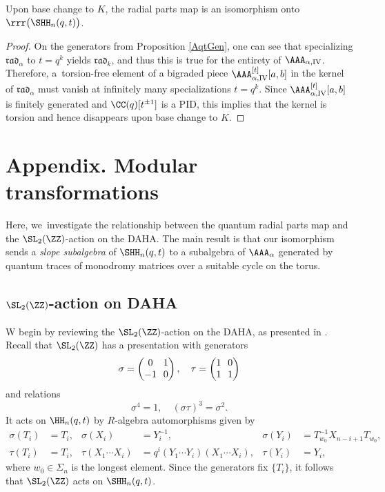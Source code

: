 \begin{thm}
Upon base change to $K$, the radial parts map is an isomorphism onto $\rrr\bigl(\SHH_n(q,t) \bigr)$.
\end{thm}

\begin{proof}
On the generators from Proposition \ref{AqtGen}, one can see that specializing $\mathfrak{rad}_\alpha$ to $t=q^k$ yields $\mathfrak{rad}_k$, and thus this is true for the entirety of $\AAA_{\alpha,\mathrm{IV}}$.
Therefore, a~torsion-free element of a bigraded piece $\AAA^{[t]}_{\alpha,\mathrm{IV}}[a,b]$ in the kernel of $\mathfrak{rad}_\alpha$ must vanish at infinitely many specializations $t=q^k$.
Since $\AAA_{\alpha,\mathrm{IV}}^{[t]}[a,b]$ is finitely generated and $\CC(q)[t^{\pm 1}]$ is a PID, this implies that the kernel is torsion and hence disappears upon base change to $K$.
\end{proof}

\appendix
{}
\section*{Appendix. Modular transformations}

Here, we~investigate the relationship between the quantum radial parts map and the $\SL_2(\ZZ)$-action on the DAHA.
The main result is that our isomorphism sends a \textit{slope subalgebra} of $\SHH_n(q,t)$ to a subalgebra of $\AAA_\alpha$ generated by quantum traces of monodromy matrices over a suitable cycle on the torus.

\subsection{$\SL_2(\ZZ)$-action on DAHA}
W begin by reviewing the $\SL_2(\ZZ)$-action on the DAHA, as presented in \cite[\S3.7]{ChereDAHA}.
Recall that $\SL_2(\ZZ)$ has a presentation with generators
\[\arraycolsep3.5pt
\sigma=
\begin{pmatrix}
0 & 1\\
-1 & 0
\end{pmatrix}
,\quad\tau=
\begin{pmatrix}
1 & 0\\
1 & 1
\end{pmatrix}
\]
and relations
\[
\sigma^4=1,\quad (\sigma\tau)^3=\sigma^2.
\]
It acts on $\HH_n(q,t)$ by $R$-algebra automorphisms given by
\begin{align*}\sigma(T_i)&=T_i, &\sigma(X_i)&=Y_i^{-1}, & \sigma(Y_i)&=T_{w_0}^{-1}X_{n-i+1}T_{w_0},\\
\tau(T_i)&=T_i, & \tau(X_1\cdots X_i)&=q^i(Y_1\cdots Y_i)(X_1\cdots X_i), & \tau(Y_i)&=Y_i,
\end{align*}
where $w_0\in\Sigma_n$ is the longest element.
Since the generators fix $\{T_i\}$, it follows that $\SL_2(\ZZ)$ acts on $\SHH_n(q,t)$.

